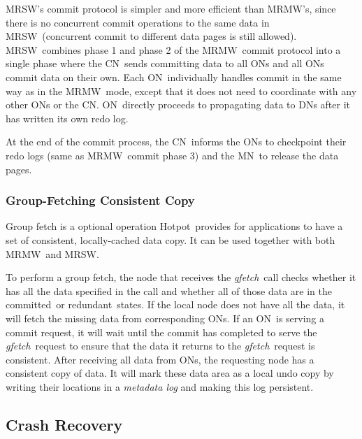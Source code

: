 \documentclass[sigconf]{acmart}
\renewcommand{\em}{\it}
\newcommand{\fetch}{\textit{gfetch}}
\newcommand{\hotpot}{Hotpot}
\newcommand{\mrmw}{MRMW}
\newcommand{\mrsw}{MRSW}
\newcommand{\on}{ON}
\newcommand{\dn}{DN}
\newcommand{\xn}{CN}
\newcommand{\master}{MN}
\newcommand{\committed}{committed}
\newcommand{\redundant}{redundant}
\providecommand{\DIFaddbegin}{} %
\providecommand{\DIFaddend}{} %
\providecommand{\DIFdelbegin}{} %
\providecommand{\DIFdelend}{} %
\begin{document}
{%
\DIFdelend {}
\mrsw's commit protocol is simpler and more efficient than \mrmw's,
since there is no concurrent commit operations to the same data in \mrsw\ (concurrent commit to different data pages is still allowed).
\mrsw\ combines phase 1 and phase 2 of the \mrmw\ commit protocol into a single phase 
where the \xn\ sends committing data to all \on{}s and all \on{}s commit data on their own.
Each \on\ individually handles commit in the same way as in the \mrmw\ mode, 
except that it does not need to coordinate with any other \on{}s or the \xn. 
\on\ directly proceeds to propagating data to \dn{}s after it has written its own redo log.

At the end of the commit process, the \xn\ informs the \on{}s to checkpoint their redo logs (same as \mrmw\ commit phase 3)
and the \master\ to release the data pages.

\DIFdelbegin %
\DIFdelend \subsubsection{Group-Fetching Consistent Copy}
\DIFdelbegin %
\DIFdelend 

Group fetch is a optional operation \hotpot\ provides for applications to have a set of consistent, locally-cached data copy.
It can be used together with both \mrmw\ and \mrsw.

To perform a group fetch, the node that receives the \fetch\ call checks whether it has all the data specified in the call
and whether all of those data are in the \committed\ or \redundant\ states.
If the local node does not have all the data, it will fetch the missing data from corresponding \on{}s.
If an \on\ is serving a commit request, it will wait until the commit has completed to serve the \fetch\ request
to ensure that the data it returns to the \fetch\ request is consistent.
After receiving all data from \on{}s, the requesting node has a consistent copy of data.
It will mark these data area as a local undo copy 
by writing their locations in a {\em metadata log} and making this log persistent.
\fi

\DIFdelbegin %
\DIFdelend \DIFaddbegin \subsection{Crash Recovery}
\DIFaddend \label{sec:recovery}
\DIFdelbegin %
\DIFdelend 

}
\end{document}
